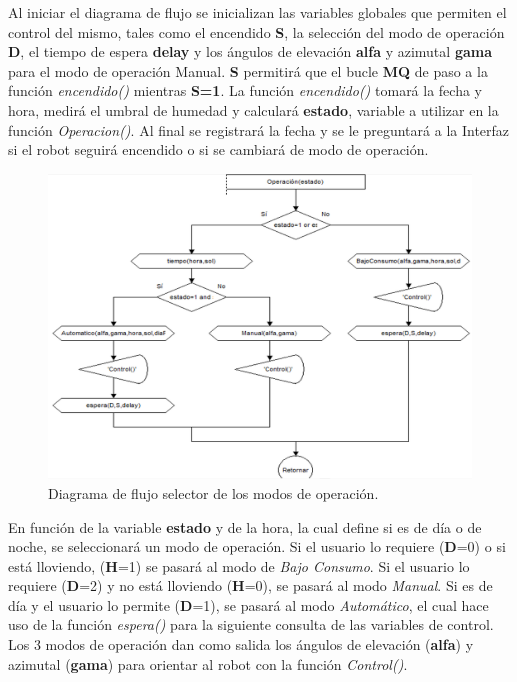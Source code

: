 Al iniciar el diagrama de flujo se inicializan las variables globales que permiten el control del mismo, tales como el encendido \textbf{S}, la selección del modo de operación \textbf{D}, el tiempo de espera \textbf{delay} y los ángulos de elevación \textbf{alfa} y azimutal \textbf{gama} para el modo de operación Manual. \textbf{S} permitirá que el bucle \textbf{MQ} de paso a la función \textit{encendido()} mientras \textbf{S=1}. La función \textit{encendido()} tomará la fecha y hora, medirá el umbral de humedad y calculará \textbf{estado}, variable a utilizar en la función \textit{Operacion()}. Al final se registrará la fecha y se le preguntará a la Interfaz si el robot seguirá encendido o si se cambiará de modo de operación.

\begin{figure}[H]
	\centering
	\includegraphics[width=\columnwidth]{imagenes/DFmain2}
	\caption{Diagrama de flujo selector de los modos de operación.}
	\label{fig:DFmain2}
\end{figure}
En función de la variable \textbf{estado} y de la hora, la cual define si es de día o de noche, se seleccionará un modo de operación. Si el usuario lo requiere (\textbf{D}=0) o si está lloviendo, (\textbf{H}=1) se pasará al modo de \textit{Bajo Consumo}. Si el usuario lo requiere (\textbf{D}=2) y no está lloviendo (\textbf{H}=0), se pasará al modo \textit{Manual}. Si es de día y el usuario lo permite (\textbf{D}=1), se pasará al modo \textit{Automático}, el cual hace uso de la función \textit{espera()} para la siguiente consulta de las variables de control. Los 3 modos de operación dan como salida los ángulos de elevación (\textbf{alfa}) y azimutal (\textbf{gama}) para orientar al robot con la función \textit{Control()}.

